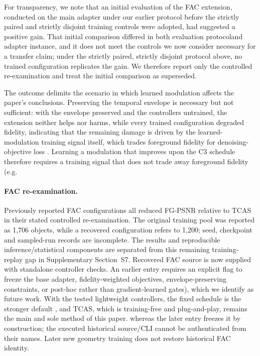 \documentclass[times,twocolumn,final]{elsarticle}
\providecommand{\DIFadd}[1]{{\protect\color{blue} \sf #1}} %
\providecommand{\DIFdel}[1]{{\protect\color{red} \scriptsize #1}} %
\providecommand{\DIFaddbegin}{} %
\providecommand{\DIFaddend}{} %
\providecommand{\DIFdelbegin}{} %
\providecommand{\DIFdelend}{} %
\begin{document}
\DIFdelbegin \DIFdel{For transparency, we note that an initial evaluation of the FAC extension, conducted on the main adapter under our earlier protocol before the strictly paired and strictly disjoint training controls were adopted, had suggested a positive gain. That initial comparison differed in both evaluation protocoland adapter instance, and it does not meet the controls we now consider necessary for a transfer claim; under the strictly paired, strictly disjoint protocol above, no trained configuration replicates the gain. We therefore report only the controlled re-examination and treat the initial comparison as superseded. }%

\DIFdel{The outcome delimits the scenario in which learned modulation affects the paper's conclusions. Preserving the temporal envelope is necessary but not sufficient: with the envelope preserved and the controllers untrained, the extension neither helps nor harms, while every trained configuration degraded fidelity, indicating that the remaining damage is driven by the learned-modulation training signal itself, which trades foreground fidelity for denoising-objective loss . Learning a modulation that improves upon the C3 schedule therefore requires a training signal that does not trade away foreground fidelity (e.g.
}\DIFdelend \DIFaddbegin \paragraph{FAC re-examination.}
\label{subsec:facreported}
\DIFadd{Previously reported FAC configurations all reduced FG-PSNR relative to TCAS in their stated controlled re-examination. The original training pool was reported as 1,706 objects, while a recovered configuration refers to 1,200; seed, checkpoint and sampled-run records are incomplete. The results and reproducible inference/statistical components are separated from this remaining training-replay gap in Supplementary Section~S7. Recovered FAC source is now supplied with standalone controller checks. An earlier entry requires an explicit flag to freeze the base adapter}\DIFaddend , \DIFdelbegin \DIFdel{fidelity-weighted objectives, envelope-preserving constraints, or post-hoc rather than gradient-learned gates), which we identify as future work. With the tested lightweight controllers, the fixed schedule is the stronger default , and TCAS, which is training-free and plug-and-play, remains the main and sole method of this paper. }\DIFdelend \DIFaddbegin \DIFadd{whereas the later entry freezes it by construction; the executed historical source/CLI cannot be authenticated from their names. Later new geometry training does not restore historical FAC identity.
}\DIFaddend 
\end{document}
